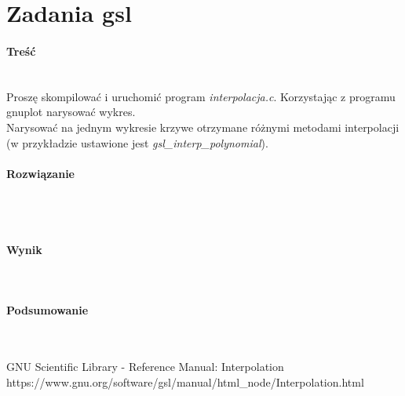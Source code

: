 \section*{Zadania gsl} \label{sec:Zadania gsl}

\paragraph{Treść} ~\\
Proszę skompilować i uruchomić program \textit{interpolacja.c}.
Korzystając z programu gnuplot narysować wykres. \\
Narysować na jednym wykresie krzywe otrzymane różnymi metodami interpolacji (w przykładzie ustawione jest \textit{gsl\_interp\_polynomial})\nocite{GslManualInterpolation}.

\paragraph{Rozwiązanie} ~\\
 ~\\

\paragraph{Wynik} ~\\

\paragraph{Podsumowanie} ~\\

\begin{thebibliography}{9}
   GNU Scientific Library - Reference Manual: Interpolation https://www.gnu.org/software/gsl/manual/html\_node/Interpolation.html
\end{thebibliography}
